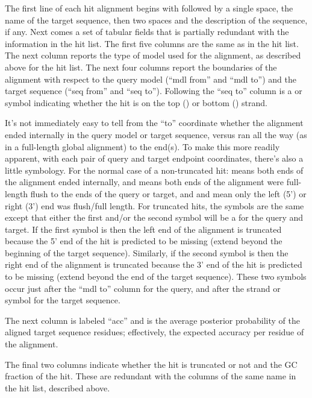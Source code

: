 The first line of each hit alignment begins with \otext{>>} followed
by a single space, the name of the target sequence, then two spaces
and the description of the sequence, if any. Next comes a set of
tabular fields that is partially redundant with the information in the
hit list. The first five columns are the same as in the hit list. The
next column reports the type of model used for the alignment, as
described above for the hit list. The next four columns report the
boundaries of the alignment with respect to the query model (``mdl
from'' and ``mdl to'') and the target sequence (``seq from'' and ``seq
to''). Following the ``seq to'' column is a \otext{+} or \otext{-}
symbol indicating whether the hit is on the top (\otext{+}) or bottom
(\otext{-}) strand.

It's not immediately easy to tell from the ``to'' coordinate whether
the alignment ended internally in the query model or target sequence,
versus ran all the way (as in a full-length global alignment) to the
end(s). To make this more readily apparent, with each pair of query
and target endpoint coordinates, there's also a little symbology. For
the normal case of a non-truncated hit:  means both ends of
the alignment ended internally, and \otext{[]} means both ends of the
alignment were full-length flush to the ends of the query or target,
and \otext{[.}  and \otext{.]} mean only the left (5') or right (3') end
was flush/full length. For truncated hits, the symbols are the same
except that either the first and/or the second symbol will be a
\otext{~} for the query and target. If the first symbol is \otext{~}
then the left end of the alignment is truncated because the 5' end of
the hit is predicted to be missing (extend beyond the beginning of the
target sequence). Similarly, if the second symbol is \otext{~} then the
right end of the alignment is truncated because the 3' end of the hit
is predicted to be missing (extend beyond the end of the target
sequence). These two symbols occur just after the ``mdl to'' column for
the query, and after the strand \otext{+} or \otext{-} symbol for the
target sequence.

The next column is labeled ``acc'' and is the average posterior
probability of the aligned target sequence residues; effectively, the
expected accuracy per residue of the alignment.

The final two columns indicate whether the hit is truncated or not and
the GC fraction of the hit. These are redundant with the columns of
the same name in the hit list, described above.

